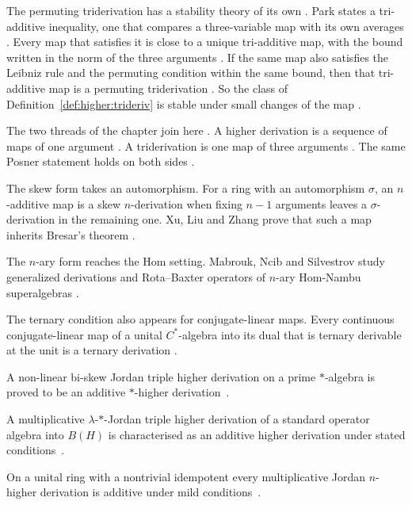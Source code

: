 The permuting triderivation has a stability theory of its own
\cite[p.~7]{Park2020Trideriv}. Park states a tri-additive inequality, one that
compares a three-variable map with its own averages
\cite[Theorem~4.3, p.~7]{Park2020Trideriv}. Every map that satisfies it is
close to a unique tri-additive map, with the bound written in the norm of the
three arguments \cite[Theorem~4.3, p.~7]{Park2020Trideriv}. If the same map also
satisfies the Leibniz rule and the permuting condition within the same bound,
then that tri-additive map is a permuting triderivation
\cite[Theorem~4.3, p.~7]{Park2020Trideriv}. So the class of
Definition~\ref{def:higher:trideriv} is stable under small changes of the map
\cite[p.~1]{Park2020Trideriv}.

The two threads of the chapter join here
\cite[p.~2323]{FerreroHaetinger2002}. A higher derivation is a sequence of
maps of one argument \cite[p.~2323]{FerreroHaetinger2002}. A triderivation
is one map of three arguments \cite[p.~490]{Yazarli2017Trideriv}. The same
Posner statement holds on both sides \cite[p.~4]{Prajapati2021}.

The skew form takes an automorphism. For a ring with an automorphism $\sigma$, an
$n$-additive map is a skew $n$-derivation when fixing $n-1$ arguments leaves a
$\sigma$-derivation in the remaining one. Xu, Liu and Zhang prove that such a map
inherits Bresar's theorem \cite[Abstract]{XuLiuZhang2013SkewN}.

The $n$-ary form reaches the Hom setting. Mabrouk, Ncib and Silvestrov study
generalized derivations and Rota--Baxter operators of $n$-ary Hom-Nambu
superalgebras \cite[Abstract]{MabroukNcibSilvestrov2020}.

The ternary condition also appears for conjugate-linear maps. Every continuous
conjugate-linear map of a unital $C^*$-algebra into its dual that is ternary
derivable at the unit is a ternary derivation
\cite[Abstract]{ConjugateLinearTernary2020}.

A non-linear bi-skew Jordan triple higher derivation on a prime $*$-algebra is proved to be an additive $*$-higher derivation~\cite{WlNon-linearBi-skewJordan2026}.

A multiplicative $\lambda$-$*$-Jordan triple higher derivation of a standard operator algebra into $B(H)$ is characterised as an additive higher derivation under stated conditions~\cite{WlMultiplicativeLambda-jorda2021}.

On a unital ring with a nontrivial idempotent every multiplicative Jordan $n$-higher derivation is additive under mild conditions~\cite{WlMultiplicativeJordanType2022}.

